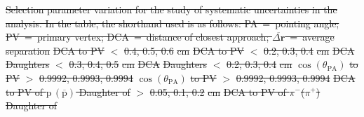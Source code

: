 \documentclass[ALICE,manyauthors]{cernphprep}
\newcommand{\LamALam}{$\Lambda$ ($\overline{\Lambda}$)\xspace}
\newcommand{\Ks}{$\mathrm{K^{0}_{S}}$\xspace}
\newcommand{\LamK}{$\Lambda$K\xspace}
\newcommand{\LamKs}{$\Lambda\mathrm{K^{0}_{S}}$\xspace}
\providecommand{\DIFdeltex}[1]{{\protect\color{red}\sout{#1}}}                      %
\providecommand{\DIFdelFL}[1]{\DIFdel{#1}} %
\providecommand{\DIFdel}[1]{\texorpdfstring{\DIFdeltex{#1}}{}} %
\begin{document}
{%
\DIFdelFL{Selection parameter variation for the study of systematic uncertainties in the analysis. In the table, the shorthand used is as follows: PA~=~pointing angle; PV~=~primary vertex; DCA~=~distance of closest approach; $\overline{\Delta\mathbf{r}}$~=~average separation}}
\DIFdelFL{DCA to PV }%
\DIFdelFL{$<$ }%
\DIFdelFL{0.4, 0.5, 0.6}%
\DIFdelFL{cm }%
\DIFdelFL{DCA to PV }%
\DIFdelFL{$<$ }%
\DIFdelFL{0.2, 0.3, 0.4}%
\DIFdelFL{cm }%
\DIFdelFL{DCA }%
\DIFdelFL{Daughters }%
\DIFdelFL{$<$ }%
\DIFdelFL{0.3, 0.4, 0.5}%
\DIFdelFL{cm }%
\DIFdelFL{DCA }%
\DIFdelFL{Daughters }%
\DIFdelFL{$<$ }%
\DIFdelFL{0.2, 0.3, 0.4}%
\DIFdelFL{cm }%
\DIFdelFL{$\cos(\theta_{\mathrm{PA}})$ }%
\DIFdelFL{to PV }%
\DIFdelFL{$>$ }%
\DIFdelFL{0.9992, 0.9993, 0.9994}%
\DIFdelFL{$\cos(\theta_{\mathrm{PA}})$ }%
\DIFdelFL{to PV }%
\DIFdelFL{$>$ }%
\DIFdelFL{0.9992, 0.9993, 0.9994}%
\DIFdelFL{DCA to PV of $\mathrm{p}\,(\overline{\mathrm{p}})$ Daughter of }%
\DIFdelFL{$>$ }%
\DIFdelFL{0.05, 0.1, 0.2}%
\DIFdelFL{cm }%
\DIFdelFL{DCA to PV of $\pi^{-}$($\pi^{+}$) Daughter of }%
\end{document}
